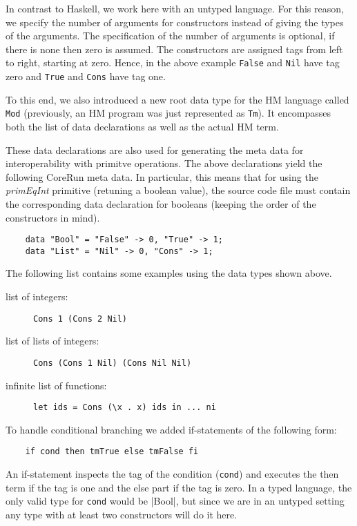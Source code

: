 \documentclass{scrartcl}
\begin{document}
In contrast to Haskell, we work here with an untyped language. For this reason, we specify the number of arguments for constructors instead of giving the types of the arguments. The specification of the number of arguments is optional, if there is none then zero is assumed. 
The constructors are assigned tags from left to right, starting at zero. Hence, in the above example \lstinline|False| and \lstinline|Nil| have tag zero and \lstinline|True| and \lstinline|Cons| have tag one.

To this end, we also introduced a new root data type for the HM language called \texttt{Mod} (previously, an HM program was just represented as \texttt{Tm}). It encompasses both the list of data declarations as well as the actual HM term.

These data declarations are also used for generating the meta data for interoperability with primitve operations. The above declarations yield the following CoreRun meta data.
In particular, this means that for using the \emph{primEqInt} primitive (retuning a boolean value), the source code file must contain the corresponding data declaration for booleans (keeping the order of the constructors in mind).

\begin{lstlisting}
    data "Bool" = "False" -> 0, "True" -> 1;
    data "List" = "Nil" -> 0, "Cons" -> 1;
\end{lstlisting}

The following list contains some examples using the data types shown above.

\begin{description}
\item[list of integers:] \lstinline|Cons 1 (Cons 2 Nil)|
\item[list of lists of integers:] \lstinline|Cons (Cons 1 Nil) (Cons Nil Nil)|
\item[infinite list of functions:] \lstinline|let ids = Cons (\x . x) ids in ... ni|
\end{description}

To handle conditional branching we added if-statements of the following form:
\begin{lstlisting}
    if cond then tmTrue else tmFalse fi
\end{lstlisting}

An if-statement inspects the tag of the condition (\lstinline|cond|) and executes the then term if the tag is one and the else part if the tag is zero. In a typed language, the only valid type for \lstinline|cond| would be |Bool|, but since we are in an untyped setting any type with at least two constructors will do it here.
\end{document}
